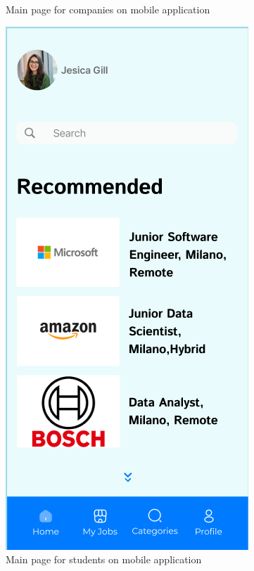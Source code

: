 \begin{figure}[ht]
\begin{minipage}{0.45\textwidth}
        \caption{Main page for companies on mobile application}
        \label{fig:image2}
    \end{minipage}
    \hspace{0.05\textwidth}  %
    \begin{minipage}{0.45\textwidth}
        \centering
        \includegraphics[width=\textwidth]{RASD-Latex/assets/UI images/mainpage_student_phone.png}
        \caption{Main page for students on mobile application}
        \label{fig:image3}
    \end{minipage}
\end{figure}

